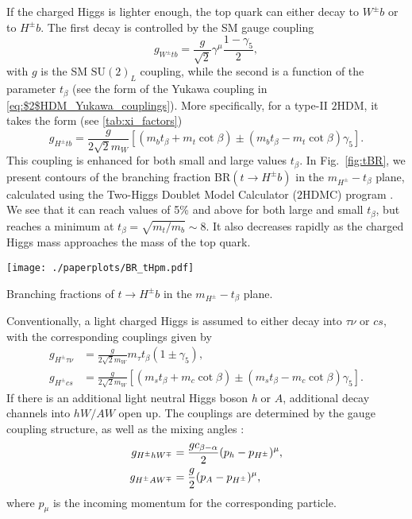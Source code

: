 If the charged Higgs is lighter enough, the top quark can either decay to $W^\pm b$ or to $H^{\pm}b$. The first decay is controlled by the SM gauge coupling
\begin{equation}
g_{W^{\pm} tb} = \frac{g}{\sqrt{2}} \gamma^\mu \frac{1-\gamma_5}{2}, 
\end{equation}
with $g$ is the SM $\text{SU}(2)_L$ coupling, while the second is a function of the parameter $t_{\beta}$ (see the form of the Yukawa coupling in \eqref{eq:$2$HDM_Yukawa_couplings}). More specifically, for a type-II $2$HDM, it takes the form (see \autoref{tab:xi_factors}) 
\begin{equation}
g_{H^{\pm} tb} = \frac{g}{2 \sqrt{2} m_W} \left[ (m_b t_{\beta} + m_t \cot \beta ) \pm (m_b t_{\beta} - m_t \cot \beta ) \gamma_5 \right].
\end{equation}
This coupling is enhanced for both small and large values $t_{\beta}$. In Fig.~\ref{fig:tBR}, we present contours of the branching fraction BR$(t \rightarrow H^{\pm} b)$ in the $m_{H^{\pm}}-t_{\beta}$ plane, calculated using the Two-Higgs Doublet Model Calculator ($2$HDMC) program \cite{Eriksson:2009ws}. We see that it can reach values of 5\% and above for both large and small $t_{\beta}$, but reaches a minimum at $t_{\beta} = \sqrt{m_t/m_b}\sim 8 $. It also decreases rapidly as the charged Higgs mass approaches the mass of the top quark.
\begin{marginfigure}
\centering
	\texttt{[image: ./paperplots/BR\_tHpm.pdf]}
\caption{Branching fractions of $t\rightarrow H^{\pm}b$ in the $m_{H^{\pm}}-t_{\beta}$ plane.}
\label{fig:tBR}
\end{marginfigure}

Conventionally, a light charged Higgs is assumed to either decay into $\tau\nu$ or $cs$, with the corresponding couplings given by
\begin{align*}
g_{H^{\pm} \tau\nu} &= \frac{g}{2 \sqrt{2} m_W} m_\tau t_{\beta}(1\pm \gamma_5 ), \\
g_{H^{\pm} cs} &= \frac{g}{2 \sqrt{2} m_W} \left[ (m_s t_{\beta} + m_c \cot \beta ) \pm (m_s t_{\beta} - m_c \cot \beta ) \gamma_5 \right].
 \end{align*}
If there is an additional light neutral Higgs boson \emph{h} or $A$, additional decay channels into $hW/AW$ open up. The couplings are determined by the gauge coupling structure, as well as the mixing angles \cite{Gunion:1989we}: 
\begin{align*}
  g_{H^{\pm} h W^{\mp}}&= \frac{gc_{\beta-\alpha}}{2}(p_{h}-p_{H^{\pm}})^\mu, \\
 g_{H^{\pm} A W^{\mp}}&= \frac{g}{2}(p_{A}-p_{H^{\pm}})^\mu, 
 \end{align*}
where $p_\mu$ is the incoming momentum for the corresponding particle. 

